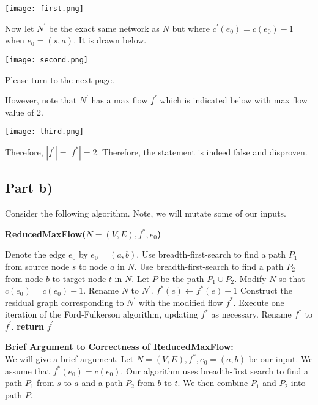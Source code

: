 \documentclass[12pt]{article}
\begin{document}
\texttt{[image: first.png]} 

Now let $N^\prime$ be the exact same network as $N$ but where $c^\prime(e_0) = c(e_0) - 1$ when $e_0 = (s,a)$. It is drawn below. 

\texttt{[image: second.png]} 

Please turn to the next page. 

\newpage

However, note that $N^\prime$ has a max flow $f^\prime$ which is indicated below with max flow value of 2. 

\texttt{[image: third.png]} 

Therefore, $|f^\prime| = |f^*| = 2$. Therefore, the statement is indeed false and disproven. 

\subsection*{Part b)}

Consider the following algorithm. Note, we will mutate some of our inputs.

\begin{algorithm}[hbt!]
\caption{\textbf{ReducedMaxFlow($N = (V,E), f^*, e_0$)}}\label{alg:cap}

\begin{algorithmic}[1]
\State Denote the edge $e_0$ by $e_0 = (a,b)$. 
\State Use breadth-first-search to find a path $P_1$ from source node $s$ to node $a$ in $N$.
\State Use breadth-first-search to find a path $P_2$ from node $b$ to target node $t$ in $N$.
\State Let $P$ be the path $P_1 \cup P_2$. 
\State Modify $N$ so that $c(e_0) = c(e_0) - 1$.
\State Rename $N$ to $N^\prime$. 
\State 
{}
    \State $f^*(e) \gets f^*(e) - 1$
\EndFor
\State
\State Construct the residual graph corresponding to $N^\prime$ with the modified flow $f^*$. 
    \State Execute one iteration of the Ford-Fulkerson algorithm, updating $f^*$ as necessary.
\EndIf
\State Rename $f^*$ to $f^\prime$. 
\State \textbf{return} $f^\prime$
\end{algorithmic}
\end{algorithm}

\textbf{Brief Argument to Correctness of ReducedMaxFlow:} \\

We will give a brief argument. Let $N = (V,E), f^*, e_0 = (a,b)$ be our input. We assume that $f^*(e_0) = c(e_0)$. Our algorithm uses breadth-first search to find a path $P_1$ from $s$ to $a$ and a path $P_2$ from $b$ to $t$. We then combine $P_1$ and $P_2$ into path $P$. \\
\end{document}
